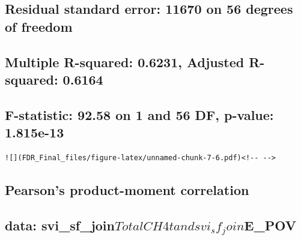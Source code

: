 \documentclass[
  12pt,
]{article}
\begin{document}
\hypertarget{residual-standard-error-11670-on-56-degrees-of-freedom}{%
\subsection{Residual standard error: 11670 on 56 degrees of
freedom}\label{residual-standard-error-11670-on-56-degrees-of-freedom}}

\hypertarget{multiple-r-squared-0.6231-adjusted-r-squared-0.6164}{%
\subsection{Multiple R-squared: 0.6231, Adjusted R-squared:
0.6164}\label{multiple-r-squared-0.6231-adjusted-r-squared-0.6164}}

\hypertarget{f-statistic-92.58-on-1-and-56-df-p-value-1.815e-13}{%
\subsection{F-statistic: 92.58 on 1 and 56 DF, p-value:
1.815e-13}\label{f-statistic-92.58-on-1-and-56-df-p-value-1.815e-13}}

\begin{verbatim}
![](FDR_Final_files/figure-latex/unnamed-chunk-7-6.pdf)<!-- --> 
\end{verbatim}

\hypertarget{section-50}{%
\subsection{}\label{section-50}}

\hypertarget{pearsons-product-moment-correlation-5}{%
\subsection{Pearson's product-moment
correlation}\label{pearsons-product-moment-correlation-5}}

\hypertarget{section-51}{%
\subsection{}\label{section-51}}

\hypertarget{data-svi_sf_jointotalch4t-and-svi_sf_joine_pov}{%
\subsection{\texorpdfstring{data:
svi\_sf\_join\(TotalCH4t and svi_sf_join\)E\_POV}{data: svi\_sf\_joinTotalCH4t and svi\_sf\_joinE\_POV}}\label{data-svi_sf_jointotalch4t-and-svi_sf_joine_pov}}
\end{document}

